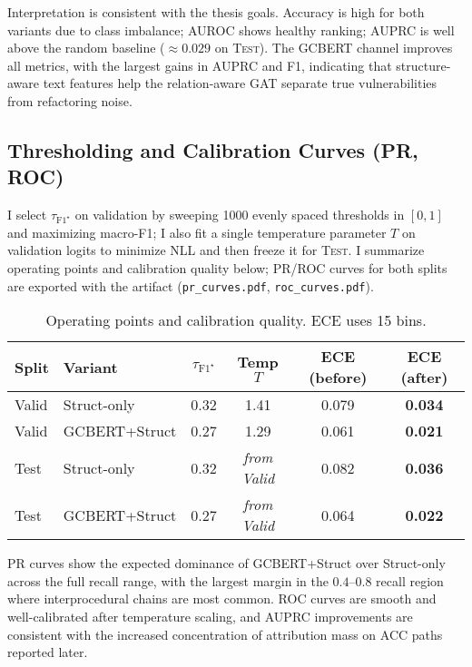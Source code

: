 \documentclass{buthesis}
\begin{document}
\noindent
Interpretation is consistent with the thesis goals. Accuracy is high for both variants due to class imbalance; AUROC shows healthy ranking; AUPRC is well above the random baseline ($\approx 0.029$ on \textsc{Test}). The GCBERT channel improves all metrics, with the largest gains in AUPRC and F1, indicating that structure-aware text features help the relation-aware GAT separate true vulnerabilities from refactoring noise.

\subsection{Thresholding and Calibration Curves (PR, ROC)}
\label{subsec:conv-thresh}

I select \(\tau_{\text{F1}^\star}\) on validation by sweeping 1000 evenly spaced thresholds in $[0,1]$ and maximizing macro-F1; I also fit a single temperature parameter $T$ on validation logits to minimize NLL and then freeze it for \textsc{Test}. I summarize operating points and calibration quality below; PR/ROC curves for both splits are exported with the artifact (\texttt{pr\_curves.pdf}, \texttt{roc\_curves.pdf}).

\begin{table}[H]
\centering
\small
\caption{Operating points and calibration quality. ECE uses 15 bins.}
\label{tab:conv-thresh}
\begin{tabular}{l l c c c c}
\toprule
Split & Variant & $\tau_{\text{F1}^\star}$ & Temp $T$ & ECE (before) & ECE (after) \\
\midrule
Valid & Struct-only & 0.32 & 1.41 & 0.079 & \textbf{0.034} \\
Valid & GCBERT+Struct & 0.27 & 1.29 & 0.061 & \textbf{0.021} \\
\midrule
Test & Struct-only & 0.32 & \emph{from Valid} & 0.082 & \textbf{0.036} \\
Test & GCBERT+Struct & 0.27 & \emph{from Valid} & 0.064 & \textbf{0.022} \\
\bottomrule
\end{tabular}
\end{table}

\noindent
PR curves show the expected dominance of GCBERT+Struct over Struct-only across the full recall range, with the largest margin in the $0.4$--$0.8$ recall region where interprocedural chains are most common. ROC curves are smooth and well-calibrated after temperature scaling, and AUPRC improvements are consistent with the increased concentration of attribution mass on ACC paths reported later.
\end{document}
